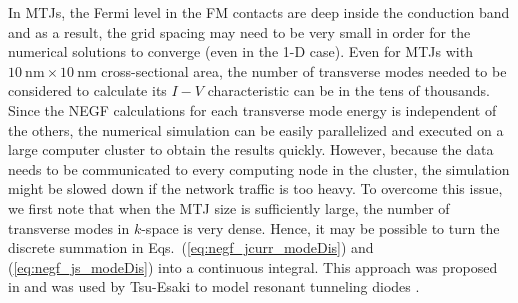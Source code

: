 In MTJs, the Fermi level in the FM contacts are deep inside the conduction band and as a result, the grid spacing may need to be very small in order for the numerical solutions to converge (even in the 1-D case). Even for MTJs with $10~\text{nm}\times10~\text{nm}$ cross-sectional area, the number of transverse modes needed to be considered to calculate its $I-V$ characteristic can be in the tens of thousands. Since the NEGF calculations for each transverse mode energy is independent of the others, the numerical simulation can be easily parallelized and executed on a large computer cluster to obtain the results quickly. However, because the data needs to be communicated to every computing node in the cluster, the simulation might be slowed down if the network traffic is too heavy. To overcome this issue, we first note that when the MTJ size is sufficiently large, the number of transverse modes in $k$-space is very dense. Hence, it may be possible to turn the discrete summation in Eqs.~(\ref{eq:negf_jcurr_modeDis}) and (\ref{eq:negf_js_modeDis}) into a continuous integral. This approach was proposed in \cite{Duke1969} and was used by Tsu-Esaki to model resonant tunneling diodes \cite{Tsu1973a}.

